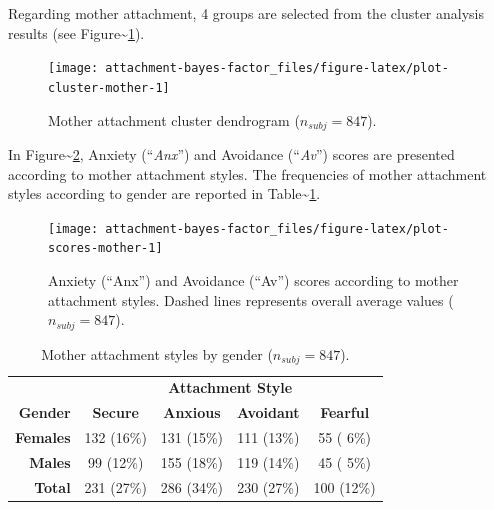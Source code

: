 \documentclass[
]{book}
\begin{document}
Regarding mother attachment, 4 groups are selected from the cluster analysis results (see Figure\textasciitilde\ref{fig:plot-cluster-mother}).

\begin{figure}

{\centering \texttt{[image: attachment-bayes-factor\_files/figure-latex/plot-cluster-mother-1]} 

}

\caption{Mother attachment cluster dendrogram ($n_{subj} = 847$).}\label{fig:plot-cluster-mother}
\end{figure}

In Figure\textasciitilde\ref{fig:plot-scores-mother}, Anxiety (``\emph{Anx}'') and Avoidance (``\emph{Av}'') scores are presented according to mother attachment styles. The frequencies of mother attachment styles according to gender are reported in Table\textasciitilde{}\ref{tab:table-cluster-mother}.

\begin{figure}

{\centering \texttt{[image: attachment-bayes-factor\_files/figure-latex/plot-scores-mother-1]} 

}

\caption{Anxiety (“Anx”) and Avoidance (“Av”) scores according to mother attachment styles. Dashed lines represents overall average values ($n_{subj} = 847$).}\label{fig:plot-scores-mother}
\end{figure}

\begin{table}[!h]

\caption{\label{tab:table-cluster-mother}Mother attachment styles by gender ($n_{subj} = 847$).}
\centering
\begin{tabular}[t]{>{}rcccc}
\toprule
\multicolumn{1}{c}{\textbf{ }} & \multicolumn{4}{c}{\textbf{Attachment Style}} \\
\cmidrule(l{3pt}r{3pt}){2-5}
\textbf{Gender} & \textbf{Secure} & \textbf{Anxious} & \textbf{Avoidant} & \textbf{Fearful}\\
\midrule
\textbf{Females} & 132 (16\%) & 131 (15\%) & 111 (13\%) & 55 ( 6\%)\\
\textbf{Males} & 99 (12\%) & 155 (18\%) & 119 (14\%) & 45 ( 5\%)\\
\textbf{Total} & 231 (27\%) & 286 (34\%) & 230 (27\%) & 100 (12\%)\\
\bottomrule
\end{tabular}
\end{table}
\end{document}
